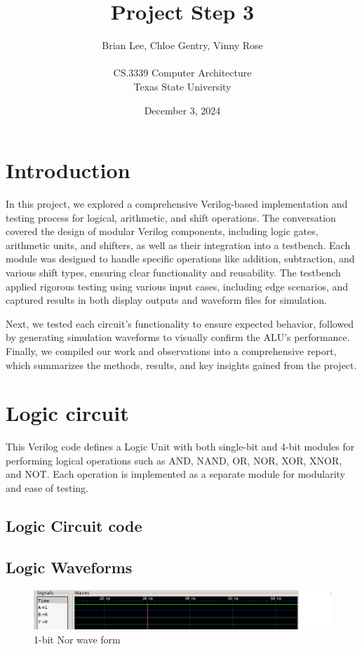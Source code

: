\documentclass[12pt]{article}
\title{Project Step 3}
\author{Brian Lee, Chloe Gentry, Vinny Rose\\
\AND\\
\AND
\AND
\AND
\AND
	CS.3339 Computer Architecture\\
\AND
	Texas State University\\
}
\date{December 3, 2024}
\begin{document}
\maketitle

\newpage
\tableofcontents
\thispagestyle{empty}


\newpage
\setcounter{page}{1}
\section{Introduction}
In this project, we explored a comprehensive Verilog-based implementation and testing process for logical, arithmetic, and shift operations. The conversation covered the design of modular Verilog components, including logic gates, arithmetic units, and shifters, as well as their integration into a testbench. Each module was designed to handle specific operations like addition, subtraction, and various shift types, ensuring clear functionality and reusability. The testbench applied rigorous testing using various input cases, including edge scenarios, and captured results in both display outputs and waveform files for simulation.

Next, we tested each circuit's functionality to ensure expected behavior, followed by generating simulation waveforms to visually confirm the ALU’s performance. Finally, we compiled our work and observations into a comprehensive report, which summarizes the methods, results, and key insights gained from the project.


\section{Logic circuit}
This Verilog code defines a Logic Unit with both single-bit and 4-bit modules for performing logical operations such as AND, NAND, OR, NOR, XOR, XNOR, and NOT. Each operation is implemented as a separate module for modularity and ease of testing.
\subsection{Logic Circuit code}


\subsection{Logic Waveforms}
\begin{figure}[H]
    \centering 
   \includegraphics[width = 1.0\textwidth]{pictures/1bitNor.PNG}
    \caption{1-bit Nor wave form}
    \label{fig:enter-label}
    \end{figure}
\end{document}
